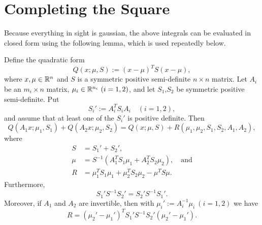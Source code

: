 \documentclass[12pt,leqno]{article}
\begin{document}
\section{Completing the Square} 
Because everything in sight is gaussian, the above integrals can be evaluated in closed form
using the following lemma, which is used repeatedly below.
\begin{Lem}
 Define the quadratic form
  $$
 Q(x;\mu,S) := (x-\mu)^TS(x-\mu),
  $$
  where $x,\mu\in {\mathbb R}^n$ and  $S$ is a symmetric positive semi-definite $n\times{n}$
  matrix. Let $A_i$ be an $m_i\times{n}$ matrix, $\mu_i\in{\mathbb R}^{n_i} ~ (i = 1,2)$,
  and let $S_1$,$S_2$ be symmetric positive semi-definite. Put
  $$
  S_i' := A_i^TS_iA_i\quad (i = 1,2),
  $$
  and assume that at least one of the $S_i'$ is positive definite.  Then 
\begin{equation}\label{comp_sq:1}
  Q(A_1x;\mu_1,S_1)+Q(A_2x;\mu_2,S_2) = Q(x;\mu,S) + R(\mu_1,\mu_2,S_1,S_2,A_1,A_2),
\end{equation}
where 
\begin{align}
S &= S_1' + S_2', \label{sigma}\\
\mu &= S^{-1}(A_1^TS_1\mu_1 + A_2^TS_2\mu_2),\quad\text{and}\label{mu}\\
R &= \mu_1^TS_1\mu_1 + \mu_2^TS_2\mu_2 - \mu^TS\mu. \label{R_def} 
\end{align}
Furthermore, 
\begin{equation}\label{comp_sq:3}
  S_1'S^{-1}S_2' = S_2'S^{-1}S_1'.
\end{equation}
Moreover, if $A_1$ and $A_2$ are invertible, then with $\mu_i' := A_i^{-1}\mu_i ~ (i = 1,2)$ we have
\begin{equation}\label{comp_sq:R}
R = (\mu_2'-\mu_1')^TS_1'S^{-1}S_2'(\mu_2'-\mu_1').
\end{equation}
\end{Lem}
\end{document}
